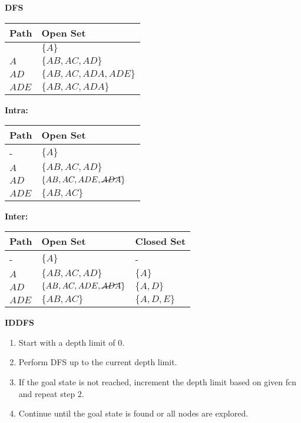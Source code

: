 \begin{example} \textbf{DFS}
    \begin{center}
        \begin{tabular}{ll}
        \toprule
        \textbf{Path} & \textbf{Open Set} \\
        \midrule
         & $\{A\}$ \\
        $A$ & $\{AB,AC,AD\}$ \\
        $AD$ & $\{AB,AC,ADA,ADE\}$ \\
        $ADE$ & $\{AB, AC,ADA\}$ \\
        \bottomrule
        \end{tabular}
    \end{center}
    \vspace{1em}

    \textbf{Intra:}
    \begin{center}
        \begin{tabular}{lll}
        \toprule
        \textbf{Path} & \textbf{Open Set} \\
        \midrule
        - & $\{A\}$ \\
        $A$ & $\{AB,AC,AD\}$ \\
        $AD$ & $\{AB,AC,ADE, \cancel{ADA}\}$ \\
        $ADE$ & $\{AB, AC\}$ \\
        \bottomrule
        \end{tabular}
    \end{center}
    \vspace{1em}

    \textbf{Inter:}
    \begin{center}
        \begin{tabular}{lll}
        \toprule
        \textbf{Path} & \textbf{Open Set} & \textbf{Closed Set} \\
        \midrule
        - & $\{A\}$ & - \\
        $A$ & $\{AB,AC,AD\}$ & $\{A\}$ \\
        $AD$ & $\{AB,AC,ADE, \cancel{ADA}\}$ & $\{A, D\}$ \\
        $ADE$ & $\{AB, AC\}$ & $\{A, D, E\}$ \\
        \bottomrule
        \end{tabular}
    \end{center}
\end{example}
\newpage

\begin{process} \textbf{IDDFS}
    \begin{enumerate}
        \item Start with a depth limit of 0.
        \item Perform DFS up to the current depth limit.
        \item If the goal state is not reached, increment the depth limit based on given fcn and repeat step 2.
        \item Continue until the goal state is found or all nodes are explored.
    \end{enumerate}
\end{process}

